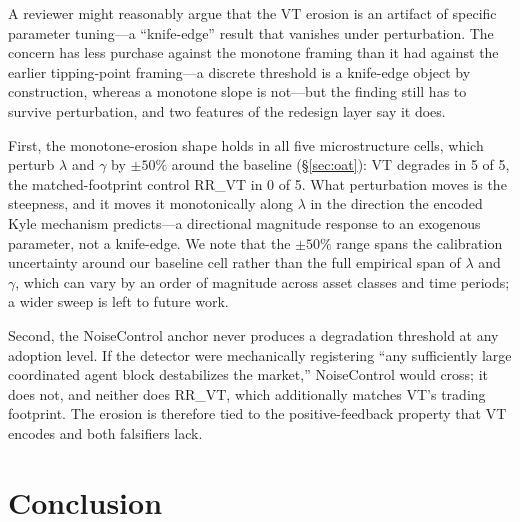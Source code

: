 \documentclass[12pt,a4paper]{article}
\begin{document}
A reviewer might reasonably argue that the VT erosion is an artifact of specific parameter tuning---a ``knife-edge'' result that vanishes under perturbation. The concern has less purchase against the monotone framing than it had against the earlier tipping-point framing---a discrete threshold is a knife-edge object by construction, whereas a monotone slope is not---but the finding still has to survive perturbation, and two features of the redesign layer say it does.

First, the monotone-erosion shape holds in all five microstructure cells, which perturb $\lambda$ and $\gamma$ by $\pm 50\%$ around the baseline (\S\ref{sec:oat}): VT degrades in 5 of 5, the matched-footprint control RR\_VT in 0 of 5. What perturbation moves is the steepness, and it moves it monotonically along $\lambda$ in the direction the encoded Kyle mechanism predicts---a directional magnitude response to an exogenous parameter, not a knife-edge. We note that the $\pm 50\%$ range spans the calibration uncertainty around our baseline cell rather than the full empirical span of $\lambda$ and $\gamma$, which can vary by an order of magnitude across asset classes and time periods; a wider sweep is left to future work.

Second, the NoiseControl anchor never produces a degradation threshold at any adoption level. If the detector were mechanically registering ``any sufficiently large coordinated agent block destabilizes the market,'' NoiseControl would cross; it does not, and neither does RR\_VT, which additionally matches VT's trading footprint. The erosion is therefore tied to the positive-feedback property that VT encodes and both falsifiers lack.

\section{Conclusion}
\label{sec:conclusion}
\end{document}
